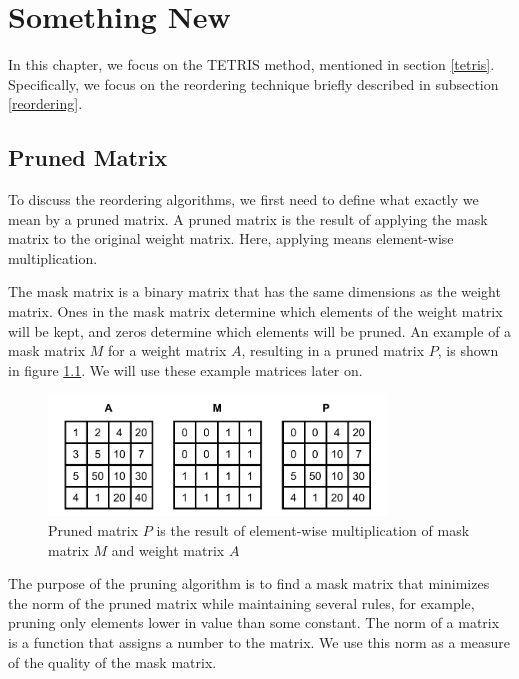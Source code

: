 \chapter{Something New}
\label{newThing}
In this chapter, we focus on the TETRIS method, mentioned in section \ref{tetris}. Specifically, we focus on the reordering technique briefly described in subsection \ref{reordering}.

\section{Pruned Matrix}
\label{sec:pruned_matrix}

To discuss the reordering algorithms, we first need to define what exactly we mean by a pruned matrix. A pruned matrix is the result of applying the mask matrix to the original weight matrix. Here, applying means element-wise multiplication.

The mask matrix is a binary matrix that has the same dimensions as the weight matrix. Ones in the mask matrix determine which elements of the weight matrix will be kept, and zeros determine which elements will be pruned. An example of a mask matrix $M$ for a weight matrix $A$, resulting in a pruned matrix $P$, is shown in figure \ref{fig:pruned}. We will use these example matrices later on.

\begin{figure}[h]
    \centerline{\includegraphics[width=0.8\textwidth]{images/pruned}}
    \caption[Pruned matrix]{Pruned matrix $P$ is the result of element-wise multiplication of mask matrix $M$ and weight matrix $A$}
    \label{fig:pruned}
\end{figure}

The purpose of the pruning algorithm is to find a mask matrix that minimizes the norm of the pruned matrix while maintaining several rules, for example, pruning only elements lower in value than some constant. The norm of a matrix is a function that assigns a number to the matrix. We use this norm as a measure of the quality of the mask matrix.

